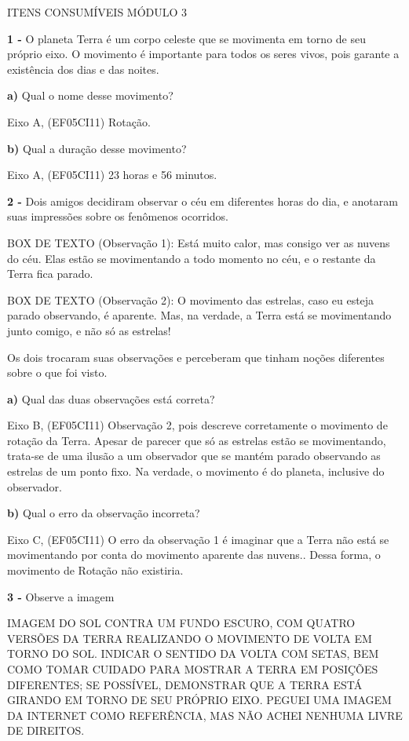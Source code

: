 \protect\hypertarget{_atydz1gwrmfr}{}{}ITENS CONSUMÍVEIS MÓDULO 3

\textbf{1 -} O planeta Terra é um corpo celeste que se movimenta em
torno de seu próprio eixo. O movimento é importante para todos os seres
vivos, pois garante a existência dos dias e das noites.

\textbf{a)} Qual o nome desse movimento?

Eixo A, (EF05CI11) Rotação.

\textbf{b)} Qual a duração desse movimento?

Eixo A, (EF05CI11) 23 horas e 56 minutos.

\textbf{2 -} Dois amigos decidiram observar o céu em diferentes horas do
dia, e anotaram suas impressões sobre os fenômenos ocorridos.

BOX DE TEXTO (Observação 1): Está muito calor, mas consigo ver as nuvens
do céu. Elas estão se movimentando a todo momento no céu, e o restante
da Terra fica parado.

BOX DE TEXTO (Observação 2): O movimento das estrelas, caso eu esteja
parado observando, é aparente. Mas, na verdade, a Terra está se
movimentando junto comigo, e não só as estrelas!

Os dois trocaram suas observações e perceberam que tinham noções
diferentes sobre o que foi visto.

\textbf{a)} Qual das duas observações está correta?

Eixo B, (EF05CI11) Observação 2, pois descreve corretamente o movimento
de rotação da Terra. Apesar de parecer que só as estrelas estão se
movimentando, trata-se de uma ilusão a um observador que se mantém
parado observando as estrelas de um ponto fixo. Na verdade, o movimento
é do planeta, inclusive do observador.

\textbf{b)} Qual o erro da observação incorreta?

Eixo C, (EF05CI11) O erro da observação 1 é imaginar que a Terra não
está se movimentando por conta do movimento aparente das nuvens.. Dessa
forma, o movimento de Rotação não existiria.

\textbf{3 -} Observe a imagem

IMAGEM DO SOL CONTRA UM FUNDO ESCURO, COM QUATRO VERSÕES DA TERRA
REALIZANDO O MOVIMENTO DE VOLTA EM TORNO DO SOL. INDICAR O SENTIDO DA
VOLTA COM SETAS, BEM COMO TOMAR CUIDADO PARA MOSTRAR A TERRA EM POSIÇÕES
DIFERENTES; SE POSSÍVEL, DEMONSTRAR QUE A TERRA ESTÁ GIRANDO EM TORNO DE
SEU PRÓPRIO EIXO. PEGUEI UMA IMAGEM DA INTERNET COMO REFERÊNCIA, MAS NÃO
ACHEI NENHUMA LIVRE DE DIREITOS.

